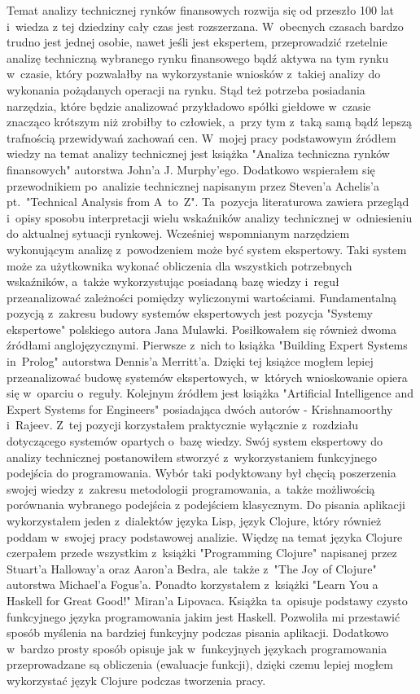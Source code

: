Temat analizy technicznej rynków finansowych rozwija się od przeszło 100 lat i~wiedza z tej dziedziny cały czas jest rozszerzana. W~obecnych czasach bardzo trudno jest jednej osobie, nawet jeśli jest ekspertem, przeprowadzić rzetelnie analizę techniczną wybranego rynku finansowego bądź aktywa na tym rynku w~czasie, który pozwalałby na wykorzystanie wniosków z~takiej analizy do wykonania pożądanych operacji na rynku. Stąd też potrzeba posiadania narzędzia, które będzie analizować przykładowo spółki giełdowe w~czasie znacząco krótszym niż zrobiłby to człowiek, a~przy tym z~taką samą bądź lepszą trafnością przewidywań zachowań cen. W~mojej pracy podstawowym źródłem wiedzy na temat analizy technicznej jest książka "Analiza techniczna rynków finansowych"\cite{analiza} autorstwa John'a J. Murphy'ego. Dodatkowo wspierałem się przewodnikiem po~analizie technicznej napisanym przez Steven'a Achelis'a pt.~"Technical Analysis from A~to~Z"\cite{achelis}. Ta~pozycja literaturowa zawiera przegląd i~opisy sposobu interpretacji wielu wskaźników analizy technicznej w~odniesieniu do aktualnej sytuacji rynkowej. Wcześniej wspomnianym narzędziem wykonującym analizę z~powodzeniem może być system ekspertowy. Taki system może za użytkownika wykonać obliczenia dla wszystkich potrzebnych wskaźników, a~także wykorzystując posiadaną bazę wiedzy i~reguł przeanalizować zależności pomiędzy wyliczonymi wartościami. Fundamentalną pozycją z~zakresu budowy systemów ekspertowych jest pozycja "Systemy ekspertowe"\cite{mulawka} polskiego autora Jana Mulawki. Posiłkowałem się również dwoma źródłami anglojęzycznymi. Pierwsze z~nich to książka "Building Expert Systems in~Prolog"\cite{merritt} autorstwa Dennis'a Merritt'a. Dzięki tej książce mogłem lepiej przeanalizować budowę systemów ekspertowych, w~których wnioskowanie opiera się w~oparciu o~reguły. Kolejnym źródłem jest książka "Artificial Intelligence and Expert Systems for Engineers"\cite{ai} posiadająca dwóch autorów - Krishnamoorthy i~Rajeev. Z~tej pozycji korzystałem praktycznie wyłącznie z~rozdziału dotyczącego systemów opartych o~bazę wiedzy. Swój system ekspertowy do analizy technicznej postanowiłem stworzyć z~wykorzystaniem funkcyjnego podejścia do programowania. Wybór taki podyktowany był chęcią poszerzenia swojej wiedzy z~zakresu metodologii programowania, a~także możliwością porównania wybranego podejścia z podejściem klasycznym. Do pisania aplikacji wykorzystałem jeden z~dialektów języka Lisp, język Clojure, który również poddam w~swojej pracy podstawowej analizie. Więdzę na temat języka Clojure czerpałem przede wszystkim z~książki "Programming Clojure" \cite{clojure} napisanej przez Stuart'a Halloway'a oraz Aaron'a Bedra, ale~także z~"The Joy of Clojure"\cite{joy} autorstwa Michael'a Fogus'a. Ponadto korzystałem z~książki "Learn You a Haskell for Great Good!"\cite{haskell} Miran'a Lipovaca. Książka ta~opisuje podstawy czysto funkcyjnego języka programowania jakim jest Haskell. Pozwoliła mi przestawić sposób myślenia na bardziej funkcyjny podczas pisania aplikacji. Dodatkowo w~bardzo prosty sposób opisuje jak w~funkcyjnych językach programowania przeprowadzane są obliczenia (ewaluacje funkcji), dzięki czemu lepiej mogłem wykorzystać język Clojure podczas tworzenia pracy.

